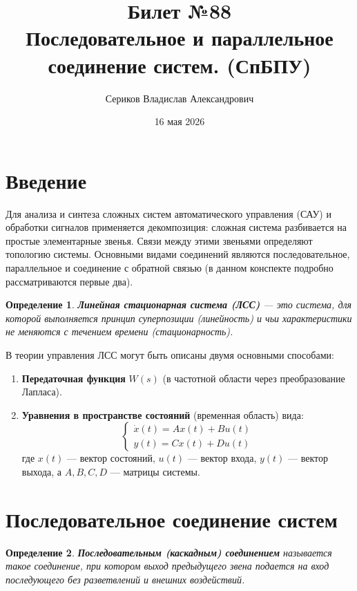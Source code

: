 \documentclass[12pt,a4paper]{article}
\title{Билет №88 \\ \small Последовательное и параллельное соединение систем. (СпБПУ)}
\author{Сериков Владислав Александрович}
\date{16 мая 2026}
\newtheorem{definition}{Определение}
\begin{document}
\maketitle
\tableofcontents
\newpage

\section{Введение}

Для анализа и синтеза сложных систем автоматического управления (САУ) и обработки сигналов применяется декомпозиция: сложная система разбивается на простые элементарные звенья. Связи между этими звеньями определяют топологию системы. Основными видами соединений являются последовательное, параллельное и соединение с обратной связью (в данном конспекте подробно рассматриваются первые два).

\begin{definition}
    \textbf{Линейная стационарная система (ЛСС)} — это система, для которой выполняется принцип суперпозиции (линейность) и чьи характеристики не меняются с течением времени (стационарность).
\end{definition}

В теории управления ЛСС могут быть описаны двумя основными способами:
\begin{enumerate}
    \item \textbf{Передаточная функция} $W(s)$ (в частотной области через преобразование Лапласа).
    \item \textbf{Уравнения в пространстве состояний} (временная область) вида:
    \begin{equation}
        \begin{cases}
            \dot{x}(t) = Ax(t) + Bu(t) \\
            y(t) = Cx(t) + Du(t)
        \end{cases}
    \end{equation}
    где $x(t)$ — вектор состояний, $u(t)$ — вектор входа, $y(t)$ — вектор выхода, а $A, B, C, D$ — матрицы системы.
\end{enumerate}

\section{Последовательное соединение систем}

\begin{definition}
    \textbf{Последовательным (каскадным) соединением} называется такое соединение, при котором выход предыдущего звена подается на вход последующего без разветвлений и внешних воздействий.
\end{definition}
\end{document}
